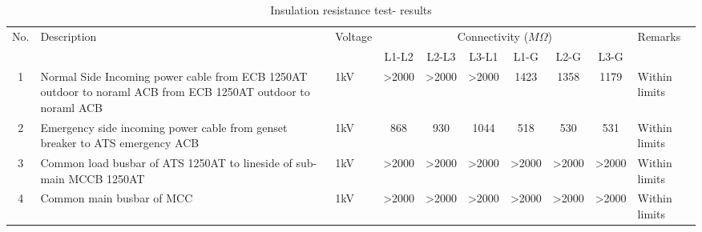 \begin{table}[!htb]
	\caption{Insulation resistance test- results}
	\label{tbl_ch04_elecaudit_integrity}
	{\scriptsize
\begin{tabular}{c|p{4cm}|l|c|c|c|c|c|c|l}
	\hline
	No. & Description & Voltage & \multicolumn{6}{c|}{Connectivity ($M\Omega$)} & Remarks \\ 
	\cline{4-9}
	&  &  & L1-L2 & L2-L3 & L3-L1 & L1-G & L2-G & L3-G &  \\ 
	\hline
	1 & Normal Side Incoming power cable from ECB 1250AT outdoor to noraml ACB from ECB 1250AT outdoor to noraml ACB & 1kV & >2000 & >2000 & >2000 & 1423 & 1358 & 1179 & Within limits \\ 
	2 & Emergency side incoming power cable from genset breaker to ATS emergency ACB & 1kV & 868 & 930 & 1044 & 518 & 530 & 531 & Within limits \\ 
	3 & Common load busbar  of ATS 1250AT to lineside of sub-main MCCB 1250AT & 1kV & >2000 & >2000 & >2000 & >2000 & >2000 & >2000 & Within limits \\ 
	4 & Common main busbar of MCC & 1kV & >2000 & >2000 & >2000 & >2000 & >2000 & >2000 & Within limits \\ 
	\hline
\end{tabular}
	}%
\end{table}